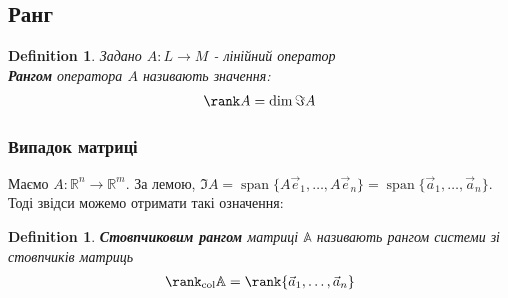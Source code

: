 \documentclass[a4paper, 10pt]{article}
\theoremstyle{theoremdd}
\newtheorem{definition}[theorem]{Definition}
\DeclareMathOperator{\linspan}{span}
\begin{document}
\iffalse
Час повернутись до формули $\det (\mathbb{A} \mathbb{B}) = \det \mathbb{A} \det \mathbb{B}$.\\
Розглянемо випадок, коли $\det \mathbb{B} = 0$\\
Тоді звідси $\{\vec{b}_1, \dots, \vec{b}_n\}$ - л.з., зокрема $\{\mathbb{A}\vec{b}_1, \dots, \mathbb{A} \vec{b}_n\}$ - л.з. $\implies \det \mathbb{A} \mathbb{B} = 0$\\
Тепер ця властивість є коректною.
\bigskip \\
Повернімось теперь до $\det \begin{pmatrix}
 \mathbb{A} & \vline & \mathbb{C} \\
 \hline
 \mathbb{O} & \vline & \mathbb{B}
\end{pmatrix} = \det \mathbb{A} \det \mathbb{B}$.\\
Знову нехай $\det \mathbb{B} = 0 \implies \det \mathbb{A} \mathbb{B} = 0$\\
Тоді звідси $\{ \vec{b}_1,\dots,\vec{b}_n \}$ - л.з. А оскільки $\det \mathbb{B} = \det \mathbb{B}^T$, то звідси $\{ \overleftarrow{b}_1,\dots,\overleftarrow{b}_n \}$ - система рядків матриці $\mathbb{B}$ - л.з.\\
А тому рядки блочно трикутної матриці - л.з. $\Rightarrow \det \begin{pmatrix}
 \mathbb{A} & \vline & \mathbb{C} \\
 \hline
 \mathbb{O} & \vline & \mathbb{B}
\end{pmatrix} = 0$.
\fi

\subsection{Ранг}
\begin{definition}
Задано $A \colon L \to M$ - лінійний оператор\\
\textbf{Рангом} оператора $A$ називають значення: 
\begin{align*}
\rank A = \dim \Im A
\end{align*}
\iffalse
\textbf{Дефектом} оператора $A$ називають значення (нам це не потрібно):
\begin{align*}
\textrm{def } A = \dim{\ker A}
\end{align*}
\fi
\end{definition}

\subsubsection*{Випадок матриці}
Маємо $A \colon \mathbb{R}^n \to \mathbb{R}^m$. За лемою, $\Im A = \linspan\{A\vec{e}_1,\dots, A\vec{e}_n\} = \linspan\{\vec{a}_1,\dots,\vec{a}_n\}$. Тоді звідси можемо отримати такі означення:
\begin{definition}
\textbf{Стовпчиковим рангом} матриці $\mathbb{A}$ називають рангом системи зі стовпчиків матриць
\begin{align*}
\rank_{\textrm{col}} \mathbb{A} = \rank \{\vec{a}_1,\dots,\vec{a}_n\}
\end{align*}
\end{definition}
\end{document}
